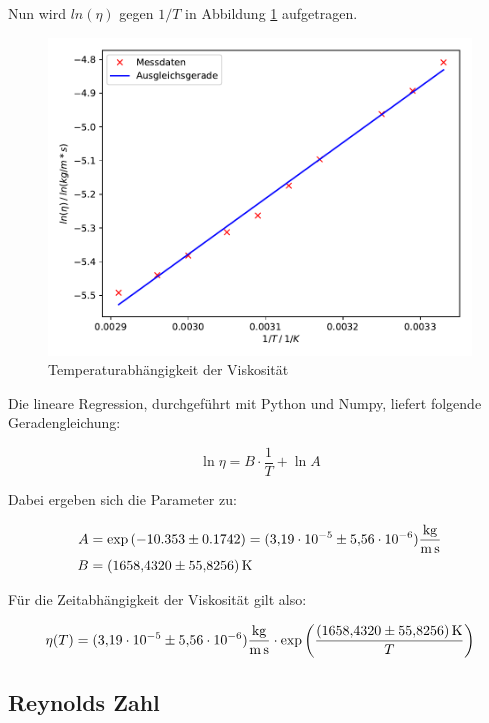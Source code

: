 Nun wird $ln(\eta)$ gegen $1/T$ in Abbildung \ref{fig:plot} aufgetragen.

\begin{figure}
  \centering
  \includegraphics[scale=0.7]{content/plot1.pdf}
  \caption{Temperaturabhängigkeit der Viskosität}
  \label{fig:plot}
\end{figure}

Die lineare Regression, durchgeführt mit Python und Numpy, 
liefert folgende Geradengleichung: 

\begin{equation}
\ln{\eta} = B\cdot \frac{1}{T} + \ln{A}
\end{equation}

Dabei ergeben sich die Parameter zu: 

\begin{align*}
A &= \exp{(-10.353\pm0.1742)} = (\num{3.19e-5}\pm\num{5.56e-6})\si{\kilo\gram\per\meter\per\second} \\
B &= \SI{1658.432+-55.8256}{\kelvin}
\end{align*}

Für die Zeitabhängigkeit der Viskosität gilt also:

\begin{equation}
\eta (T) = (\num{3.19e-5}\pm\num{5.56e-6})\si{\kilo\gram\per\meter\per\second} \cdot \exp{\left(\frac{\SI{1658.432+-55.8256}{\kelvin}}{T}\right)}
\end{equation}

\subsection{Reynolds Zahl}

